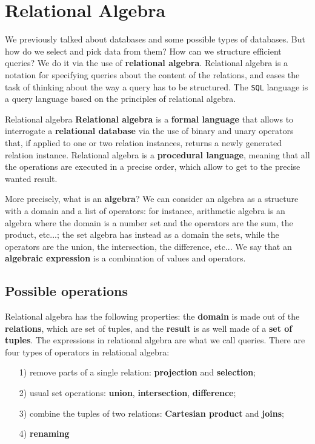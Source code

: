 \chapter{Relational Algebra}

We previously talked about databases and some possible types of databases. But how do we select and pick data from them? How can we structure efficient queries? We do it via the use of \textbf{relational algebra}. Relational algebra is a notation for specifying queries about the content of the relations, and eases the task of thinking about the way a query has to be structured. The \texttt{SQL} language is a query language based on the principles of relational algebra.

\begin{definition}{Relational algebra}
    \textbf{Relational algebra} is a \textbf{formal language} that allows to interrogate a \textbf{relational database} via the use of binary and unary operators that, if applied to one or two relation instances, returns a newly generated relation instance. Relational algebra is a \textbf{procedural language}, meaning that all the operations are executed in a precise order, which allow to get to the precise wanted result.
\end{definition}

More precisely, what is an \textbf{algebra}? We can consider an algebra as a structure with a domain and a list of operators: for instance, arithmetic algebra is an algebra where the domain is a number set and the operators are the sum, the product, etc...; the set algebra has instead as a domain the sets, while the operators are the union, the intersection, the difference, etc... We say that an \textbf{algebraic expression} is a combination of values and operators.

\section{Possible operations}

Relational algebra has the following properties: the \textbf{domain} is made out of the \textbf{relations}, which are set of tuples, and the \textbf{result} is as well made of a \textbf{set of tuples}. The expressions in relational algebra are what we call queries. There are four types of operators in relational algebra:
\begin{itemize}
    \item [1)] remove parts of a single relation: \textbf{projection} and \textbf{selection};
    \item [2)] usual set operations: \textbf{union}, \textbf{intersection}, \textbf{difference};
    \item [3)] combine the tuples of two relations: \textbf{Cartesian product} and \textbf{joins};
    \item [4)] \textbf{renaming}
\end{itemize}

